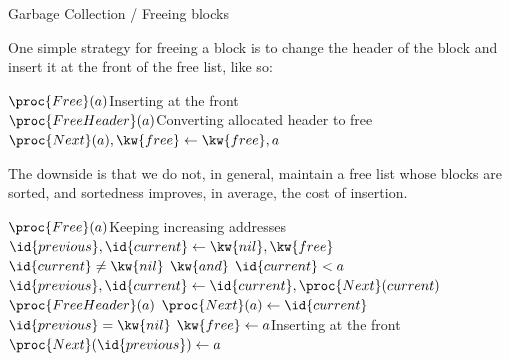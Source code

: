 \documentclass[compress,dvipdfmx]{beamer}
\begin{document}
%
\begin{frame}{Garbage Collection / Freeing blocks}

  One simple strategy for freeing a block is to change the header of
  the block and insert it at the front of the free list, like so:
  \begin{codebox}
    \(\proc{Free}(a)\)\RComment Inserting at the front\\
    \li \(\proc{FreeHeader}(a)\)\RComment Converting allocated header
    to free
    \li \(\proc{Next}(a), \kw{free} \gets \kw{free}, a\)
  \end{codebox}

  The downside is that we do not, in general, maintain a free list
  whose blocks are sorted, and sortedness improves, in average, the
  cost of insertion.
  \begin{codebox}
    \(\proc{Free}(a)\)\RComment Keeping increasing addresses\\
    \li \(\id{previous}, \id{current} \gets \kw{nil}, \kw{free}\)
    \li \While \(\id{current} \neq \kw{nil} \,\; \kw{and} \,\;
                 \id{current} < a\) 
    \li \> \(\id{previous}, \id{current}
    \gets \id{current}, \proc{Next}(current)\)
        \End
    \li \(\proc{FreeHeader}(a)\)
    \li \(\proc{Next}(a) \gets \id{current}\)
    \li {} \(\id{previous} = \kw{nil}\)  \(\kw{free}
    \gets a\)\RComment Inserting at the front
    \li \>  \(\proc{Next}(\id{previous}) \gets a\)
  \end{codebox}

\end{frame}
\end{document}
